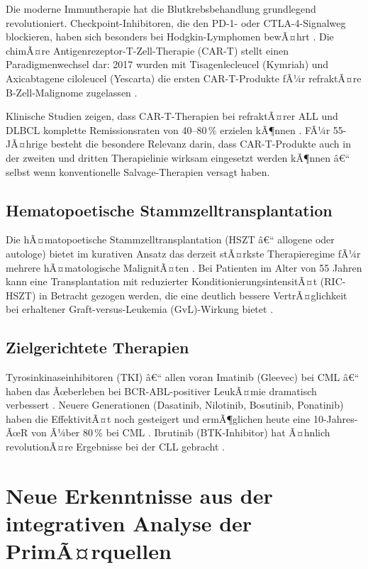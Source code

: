﻿\documentclass[12pt,a4paper]{article}
\theoremstyle{definition}
\begin{document}
Die moderne Immuntherapie hat die Blutkrebsbehandlung grundlegend revolutioniert.
Checkpoint-Inhibitoren, die den PD-1- oder CTLA-4-Signalweg blockieren, haben sich
besonders bei Hodgkin-Lymphomen bewÃ¤hrt \cite{adeyemi2025}. Die chimÃ¤re
Antigenrezeptor-T-Zell-Therapie (CAR-T) stellt einen Paradigmenwechsel dar: 2017
wurden mit Tisagenlecleucel (Kymriah) und Axicabtagene ciloleucel (Yescarta) die
ersten CAR-T-Produkte fÃ¼r refraktÃ¤re B-Zell-Malignome zugelassen \cite{june2018}.

Klinische Studien zeigen, dass CAR-T-Therapien bei refraktÃ¤rer ALL und DLBCL
komplette Remissionsraten von 40--80\,\% erzielen kÃ¶nnen \cite{maude2018,locke2019}.
FÃ¼r 55-JÃ¤hrige besteht die besondere Relevanz darin, dass CAR-T-Produkte auch in der
zweiten und dritten Therapielinie wirksam eingesetzt werden kÃ¶nnen â€“ selbst wenn
konventionelle Salvage-Therapien versagt haben.

\subsection{Hematopoetische Stammzelltransplantation}

Die hÃ¤matopoetische Stammzelltransplantation (HSZT â€“ allogene oder autologe)
bietet im kurativen Ansatz das derzeit stÃ¤rkste Therapieregime fÃ¼r mehrere
hÃ¤matologische MalignitÃ¤ten \cite{adeyemi2025}. Bei Patienten im Alter von 55 Jahren
kann eine Transplantation mit reduzierter KonditionierungsintensitÃ¤t (RIC-HSZT)
in Betracht gezogen werden, die eine deutlich bessere VertrÃ¤glichkeit bei erhaltener
Graft-versus-Leukemia (GvL)-Wirkung bietet \cite{schroeder2018,schroeder2018b}.

\subsection{Zielgerichtete Therapien}

Tyrosinkinaseinhibitoren (TKI) â€“ allen voran Imatinib (Gleevec) bei CML â€“ haben das
Ãœberleben bei BCR-ABL-positiver LeukÃ¤mie dramatisch verbessert \cite{druker2006}.
Neuere Generationen (Dasatinib, Nilotinib, Bosutinib, Ponatinib) haben die
EffektivitÃ¤t noch gesteigert und ermÃ¶glichen heute eine 10-Jahres-ÃœR von Ã¼ber 80\,\%
bei CML \cite{hochhaus2017}. Ibrutinib (BTK-Inhibitor) hat Ã¤hnlich revolutionÃ¤re
Ergebnisse bei der CLL gebracht \cite{mccabe2015}.

\section{Neue Erkenntnisse aus der integrativen Analyse der PrimÃ¤rquellen}
\label{sec:neue_erkenntnisse}
\end{document}
